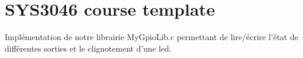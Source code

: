 \chapter{SYS3046 course template }
\hypertarget{index}{}\label{index}
\begin{DoxyVerb}       Implémentation de notre librairie MyGpioLib.c permettant de lire/écrire
       l'état de différentes sorties et le clignotement d'une led.
\end{DoxyVerb}
 